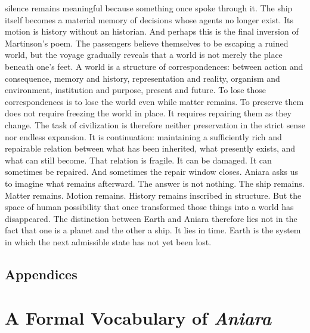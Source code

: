\documentclass[11pt,oneside]{book}
\theoremstyle{definition}
\theoremstyle{remark}
\begin{document}
silence remains meaningful because something once spoke through it. The ship itself becomes a
material memory of decisions whose agents no longer exist. Its motion is history without an
historian. And perhaps this is the final inversion of Martinson's poem. The passengers believe
themselves to be escaping a ruined world, but the voyage gradually reveals that a world is not
merely the place beneath one's feet. A world is a structure of correspondences: between action and
consequence, memory and history, representation and reality, organism and environment, institution
and purpose, present and future. To lose those correspondences is to lose the world even while
matter remains. To preserve them does not require freezing the world in place. It requires repairing
them as they change. The task of civilization is therefore neither preservation in the strict sense
nor endless expansion. It is continuation: maintaining a sufficiently rich and repairable relation
between what has been inherited, what presently exists, and what can still become. That relation is
fragile. It can be damaged. It can sometimes be repaired. And sometimes the repair window closes.
Aniara asks us to imagine what remains afterward. The answer is not nothing. The ship remains.
Matter remains. Motion remains. History remains inscribed in structure. But the space of human
possibility that once transformed those things into a world has disappeared. The distinction between
Earth and Aniara therefore lies not in the fact that one is a planet and the other a ship. It lies
in time. Earth is the system in which the next admissible state has not yet been lost.

\newpage
\section*{Appendices}

\appendix

\chapter{A Formal Vocabulary of \emph{Aniara}}\label{app:formal-vocabulary}
\end{document}
